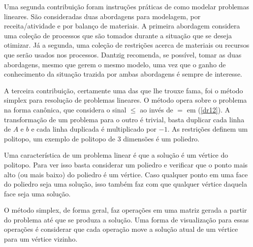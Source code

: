 Uma segunda contribuição foram instruções práticas de como modelar problemas lineares.
São consideradas duas abordagens para modelagem, por receita/atividade e por balanço
de materiais. A primeira abordagem considera uma coleção de processos que são tomados
durante a situação que se deseja otimizar. Já a segunda, uma coleção de restrições acerca
de materiais ou recursos que serão usados nos processos. Dantzig recomenda, se possível,
tomar as duas abordagens, mesmo que gerem o mesmo modelo, uma vez que o ganho de conhecimento
da situação trazida por ambas abordagens é sempre de interesse.

A terceira contribuição, certamente uma das que lhe trouxe fama, foi o método simplex para
resolução de problemas lineares. O método opera sobre o problema na forma canônica, que
considera o sinal \(\leq\) ao invés de \(=\) em (\ref{dr12}). A transformação de um problema
para o outro é trivial, basta duplicar cada linha de \(A\) e \(b\) e cada linha duplicada
é multiplicado por \(-1\). As restrições definem um politopo, um exemplo de politopo
de 3 dimensões é um poliedro.

Uma característica de um problema linear é que a solução é um vértice do politopo. Para ver
isso basta considerar um poliedro e verificar que o ponto mais alto (ou mais baixo) do
poliedro é um vértice. Caso qualquer ponto em uma face do poliedro seja uma solução, isso
também faz com que qualquer vértice daquela face seja uma solução.

O método simplex, de forma geral, faz operações em uma matriz gerada a partir do problema
até que se produza a solução. Uma forma de visualização para essas operações é considerar
que cada operação move a solução atual de um vértice para um vértice vizinho.
